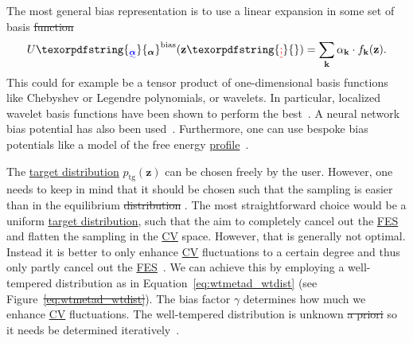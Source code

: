 \documentclass[9pt,review]{livecoms}
\newcommand{\vz}{\mathbf{z}}
\providecommand{\DIFaddtex}[1]{{\protect\color{blue}\uwave{#1}}} %
\providecommand{\DIFdeltex}[1]{{\protect\color{red}\sout{#1}}}                      %
\providecommand{\DIFaddbegin}{} %
\providecommand{\DIFaddend}{} %
\providecommand{\DIFdelbegin}{} %
\providecommand{\DIFdelend}{} %
\providecommand{\DIFadd}[1]{\texorpdfstring{\DIFaddtex{#1}}{#1}} %
\providecommand{\DIFdel}[1]{\texorpdfstring{\DIFdeltex{#1}}{}} %
\newcommand{\DIFscaledelfig}{0.5}
\newlength{\DIFdelgraphicswidth} %
\newlength{\DIFdelgraphicsheight} %
\newcommand{\DIFaddincludegraphics}[2][]{{\color{blue}\fbox{\DIFOincludegraphics[#1]{#2}}}} %
\newcommand{\DIFdelincludegraphics}[2][]{%
\sbox{\DIFdelgraphicsbox}{\DIFOincludegraphics[#1]{#2}}%
\settoboxwidth{\DIFdelgraphicswidth}{\DIFdelgraphicsbox} %
\settoboxtotalheight{\DIFdelgraphicsheight}{\DIFdelgraphicsbox} %
\scalebox{\DIFscaledelfig}{%
\parbox[b]{\DIFdelgraphicswidth}{\usebox{\DIFdelgraphicsbox}\\[-\baselineskip] \rule{\DIFdelgraphicswidth}{0em}}\llap{\resizebox{\DIFdelgraphicswidth}{\DIFdelgraphicsheight}{%
\setlength{\unitlength}{\DIFdelgraphicswidth}%
\begin{picture}(1,1)%
\thicklines\linethickness{2pt} %
{\color[rgb]{1,0,0}\put(0,0){\framebox(1,1){}}}%
{\color[rgb]{1,0,0}\put(0,0){\line( 1,1){1}}}%
{\color[rgb]{1,0,0}\put(0,1){\line(1,-1){1}}}%
\end{picture}%
}\hspace*{3pt}}} %
} %
\DeclareRobustCommand{\DIFaddbegin}{\DIFOaddbegin \let\includegraphics\DIFaddincludegraphics} %
\DeclareRobustCommand{\DIFaddend}{\DIFOaddend \let\includegraphics\DIFOincludegraphics} %
\DeclareRobustCommand{\DIFdelbegin}{\DIFOdelbegin \let\includegraphics\DIFdelincludegraphics} %
\DeclareRobustCommand{\DIFdelend}{\DIFOaddend \let\includegraphics\DIFOincludegraphics} %
\begin{document}
The most general bias representation is to use a linear expansion in some set of basis \DIFdelbegin \DIFdel{function
}\DIFdelend \DIFaddbegin \DIFadd{functions
}\DIFaddend \begin{equation}
U\DIFaddbegin \DIFadd{_{\boldsymbol{\alpha}}}\DIFaddend ^{\mathrm{bias}}(\vz\DIFdelbegin \DIFdel{;}%
\DIFdelend ) = \sum_{\mathbf{k}} \alpha_{\mathbf{k}} \cdot f_{\mathbf{k}}(\vz).
\end{equation}
This could for example be a tensor product of one-dimensional basis functions like Chebyshev or Legendre polynomials, or wavelets. In particular, localized wavelet basis functions have been shown to perform the best~\cite{ValssonPampel_Wavelets_2022}. A neural network bias potential has also been used~\cite{Bonati2019_NN-VES}. Furthermore, one can use bespoke bias potentials like a model of the free energy \hyperlink{ref:FES} {profile}~\cite{McCarty2016_JCTC,Piaggi2016_Faraday}.

The \hyperlink{ref:targetdist}{target distribution} $p_{\mathrm{tg}}(\vz)$ can be chosen freely by the user. However, one needs to keep in mind that it should be chosen such that the sampling is easier than in the equilibrium \DIFdelbegin \DIFdel{distribution}\DIFdelend \DIFaddbegin \hyperlink{ref:Distribution} {\DIFadd{distribution}} \DIFaddend . The most straightforward choice would be a uniform \hyperlink{ref:targetdist}{target distribution}, such that the aim to completely cancel out the \hyperlink{ref:FES} {FES} and flatten the sampling in the \hyperlink{ref:CV} {CV} space. However, that is generally not optimal. Instead it is better to only enhance \hyperlink{ref:CV} {CV} fluctuations to a certain degree and thus only partly cancel out the \hyperlink{ref:FES} {FES}~\cite{Valsson-JCTC-2015}. We can achieve this by employing a well-tempered distribution as in Equation~\ref{eq:wtmetad_wtdist} (see Figure~\DIFdelbegin \DIFdel{\ref{eq:wtmetad_wtdist}}\DIFdelend \DIFaddbegin \DIFadd{\ref{fig:MetaD}}\DIFaddend ). The bias factor $\gamma$ determines how much we enhance \hyperlink{ref:CV} {CV} fluctuations. The well-tempered distribution is unknown \DIFdelbegin \DIFdel{a priori }\DIFdelend \DIFaddbegin \textit{\DIFadd{a priori}} \DIFaddend so it needs be determined iteratively~\cite{Valsson-JCTC-2015}.
\end{document}
